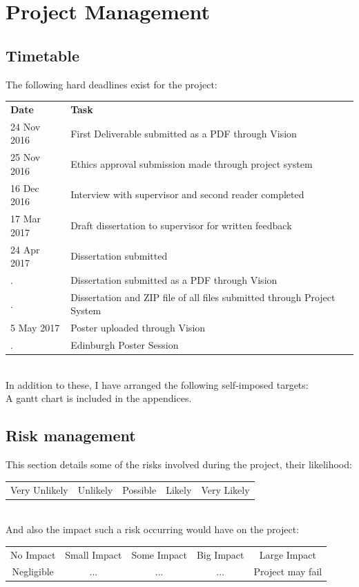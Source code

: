 \documentclass[a4paper,11pt]{report}
\begin{document}
\chapter{Project Management}
\section{Timetable}
The following hard deadlines exist for the project:\\
\begin{tabularx}{\textwidth}{lX}
\textbf{Date} & \textbf{Task}\\
24 Nov 2016 & First Deliverable submitted as a PDF through Vision\\
25 Nov 2016 & Ethics approval submission made through project system\\
16 Dec 2016 & Interview with supervisor and second reader completed\\
17 Mar 2017 & Draft dissertation to supervisor for written feedback\\
24 Apr 2017 & Dissertation submitted\\
. & Dissertation submitted as a PDF through Vision\\
. & Dissertation and ZIP file of all files submitted through Project System\\
 5 May 2017 & Poster uploaded through Vision\\
. & Edinburgh Poster Session
\end{tabularx}\\
In addition to these, I have arranged the following self-imposed targets:\\
A gantt chart is included in the appendices.
\section{Risk management}
This section details some of the risks involved during the project, their likelihood:\\
\begin{tabular}{c|c|c|c|c}
Very Unlikely & Unlikely & Possible & Likely & Very Likely
\end{tabular}\\
And also the impact such a risk occurring would have on the project:\\
\begin{tabular}{c|c|c|c|c}
 No Impact & Small Impact & Some Impact & Big Impact & Large Impact\\
 Negligible & ... & ... & ... & Project may fail
\end{tabular}\\
\end{document}
